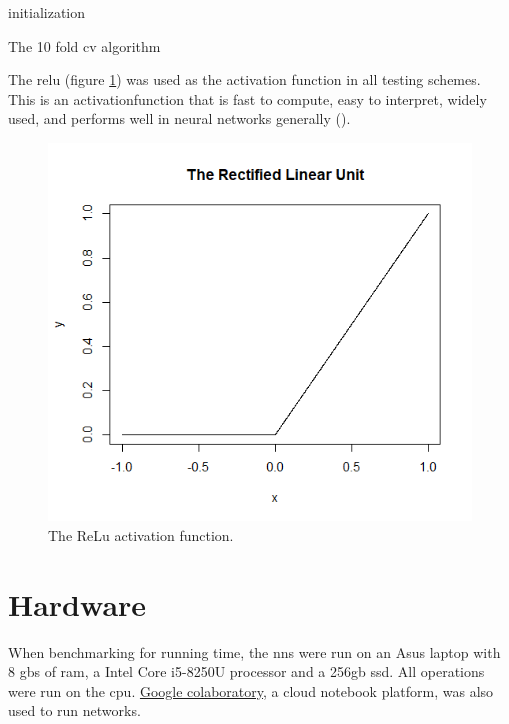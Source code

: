 \begin{algorithm}[H]
\SetAlgoLined
{}
 initialization\;
    \caption{The 10 fold \gls{cv} algorithm}
    \label{algo:10-fold-cv}
\end{algorithm}

The \gls{relu} (figure \ref{fig:relu_function}) was used as the activation function in all testing schemes. This is an \gls{activationfunction} that is fast to compute, easy to interpret, widely used, and performs well in neural networks generally (\cite{activation_search}). 

\begin{figure}
    \includegraphics[scale=0.5]{figs/relu.png}
    \caption{The ReLu activation function.}
    \label{fig:relu_function}
\end{figure}

\section{Hardware}

When benchmarking for running time, the \gls{nn}s were run on an Asus laptop with 8 \gls{gb}s of \gls{ram}, a Intel Core i5-8250U processor and a 256\gls{gb} \gls{ssd}. All operations were run on the \gls{cpu}. \href{https://colab.research.google.com/}{Google colaboratory}, a cloud notebook platform, was also used to run networks.